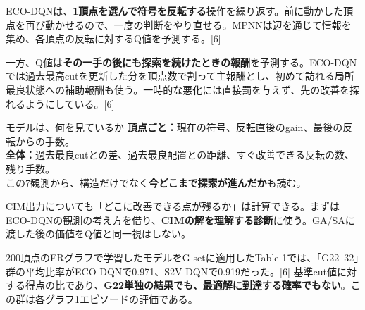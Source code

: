 \newpage
{}
ECO-DQNは、\textbf{1頂点を選んで符号を反転する}操作を繰り返す。前に動かした頂点を再び動かせるので、一度の判断をやり直せる。MPNNは辺を通じて情報を集め、各頂点の反転に対するQ値を予測する。[6]

\begin{center}
\end{center}


一方、Q値は\textbf{その一手の後にも探索を続けたときの報酬}を予測する。ECO-DQNでは過去最高cutを更新した分を頂点数で割って主報酬とし、初めて訪れる局所最良状態への補助報酬も使う。一時的な悪化には直接罰を与えず、先の改善を探れるようにしている。[6]

\begin{point}{モデルは、何を見ているか}
\textbf{頂点ごと：}現在の符号、反転直後のgain、最後の反転からの手数。\\
\textbf{全体：}過去最良cutとの差、過去最良配置との距離、すぐ改善できる反転の数、残り手数。\\[1mm]
この7観測から、構造だけでなく\textbf{今どこまで探索が進んだか}も読む。
\end{point}
CIM出力についても「どこに改善できる点が残るか」は計算できる。まずはECO-DQNの観測の考え方を借り、\textbf{CIMの解を理解する診断}に使う。GA/SAに渡した後の価値をQ値と同一視はしない。

\newpage
{}
200頂点のERグラフで学習したモデルをG-setに適用したTable 1では、「G22--32」群の平均比率がECO-DQNで0.971、S2V-DQNで0.919だった。[6] 基準cut値に対する得点の比であり、\textbf{G22単独の結果でも、最適解に到達する確率でもない}。この群は各グラフ1エピソードの評価である。


